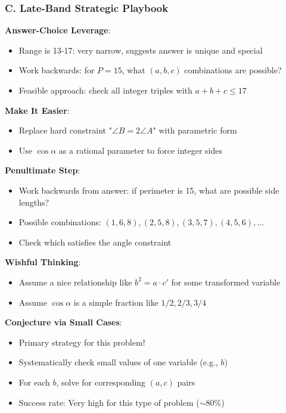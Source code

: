 \documentclass[12pt]{article}
\begin{document}
\begin{strategicbox}
\subsubsection*{C. Late-Band Strategic Playbook}

\textbf{Answer-Choice Leverage}:
\begin{itemize}
    \item Range is 13-17: very narrow, suggests answer is unique and special
    \item Work backwards: for $P = 15$, what $(a,b,c)$ combinations are possible?
    \item Feasible approach: check all integer triples with $a+b+c \leq 17$
\end{itemize}

\textbf{Make It Easier}:
\begin{itemize}
    \item Replace hard constraint "$\angle B = 2\angle A$" with parametric form
    \item Use $\cos \alpha$ as a rational parameter to force integer sides
\end{itemize}

\textbf{Penultimate Step}:
\begin{itemize}
    \item Work backwards from answer: if perimeter is 15, what are possible side lengths?
    \item Possible combinations: $(1,6,8), (2,5,8), (3,5,7), (4,5,6), \ldots$
    \item Check which satisfies the angle constraint
\end{itemize}

\textbf{Wishful Thinking}:
\begin{itemize}
    \item Assume a nice relationship like $b^2 = a \cdot c'$ for some transformed variable
    \item Assume $\cos \alpha$ is a simple fraction like $1/2, 2/3, 3/4$
\end{itemize}

\textbf{Conjecture via Small Cases}:
\begin{itemize}
    \item Primary strategy for this problem!
    \item Systematically check small values of one variable (e.g., $b$)
    \item For each $b$, solve for corresponding $(a,c)$ pairs
    \item Success rate: Very high for this type of problem ($\sim$80\%)
\end{itemize}

\end{strategicbox}
\end{document}
